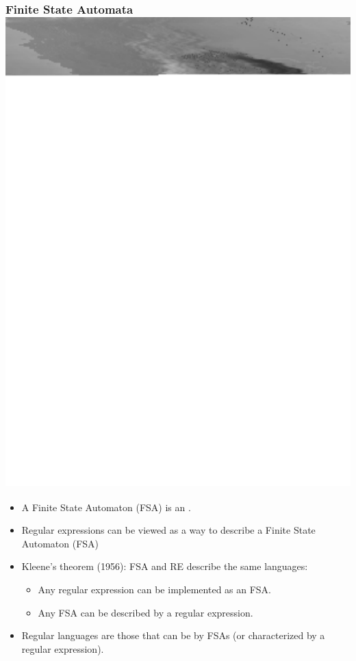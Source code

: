 \begin{frame}[fragile]
 \frametitle{Finite State Automata\hfill \includegraphics[scale=.15]{../images/skleene}}

\begin{itemize}[<+->]
\item A Finite State Automaton (FSA) is an .

\item Regular expressions can be viewed as a way to describe a Finite
  State Automaton (FSA)
  
\item Kleene's theorem (1956): FSA and RE describe the same languages:
  \begin{itemize}
    \item Any regular expression can be implemented as an FSA.
    \item Any FSA can be described by a regular expression.
  \end{itemize}
  
\item Regular languages are those that can be  by FSAs (or
  characterized by a regular expression).
  \end{itemize}

\end{frame}

